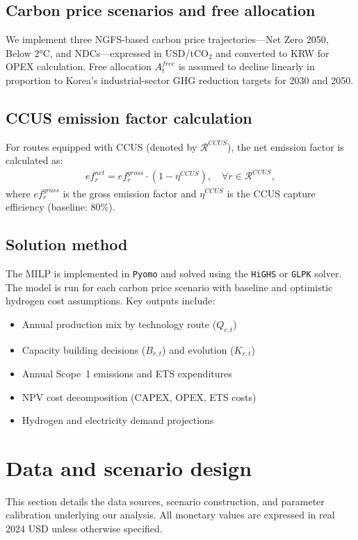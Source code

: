 \documentclass[preprint,5p,authoryear]{elsarticle}
\begin{document}
\subsection{Carbon price scenarios and free allocation}
We implement three NGFS-based carbon price trajectories—Net Zero 2050, Below 2°C, and NDCs—expressed in USD/tCO$_2$ and converted to KRW for OPEX calculation. Free allocation $A^{free}_t$ is assumed to decline linearly in proportion to Korea's industrial-sector GHG reduction targets for 2030 and 2050.

\subsection{CCUS emission factor calculation}
For routes equipped with CCUS (denoted by $\mathcal{R}^{CCUS}$), the net emission factor is calculated as:
\begin{align}
ef_r^{net} = ef_r^{gross} \cdot (1 - \eta^{CCUS}), \quad \forall r \in \mathcal{R}^{CCUS},
\end{align}
where $ef_r^{gross}$ is the gross emission factor and $\eta^{CCUS}$ is the CCUS capture efficiency (baseline: 80\%).

\subsection{Solution method}
The MILP is implemented in \texttt{Pyomo} and solved using the \texttt{HiGHS} or \texttt{GLPK} solver. The model is run for each carbon price scenario with baseline and optimistic hydrogen cost assumptions. Key outputs include:
\begin{itemize}[leftmargin=*]
  \item Annual production mix by technology route ($Q_{r,t}$)
  \item Capacity building decisions ($B_{r,t}$) and evolution ($K_{r,t}$)
  \item Annual Scope~1 emissions and ETS expenditures
  \item NPV cost decomposition (CAPEX, OPEX, ETS costs)
  \item Hydrogen and electricity demand projections
\end{itemize}

\section{Data and scenario design}

This section details the data sources, scenario construction, and parameter calibration underlying our analysis. All monetary values are expressed in real 2024 USD unless otherwise specified.
\end{document}
